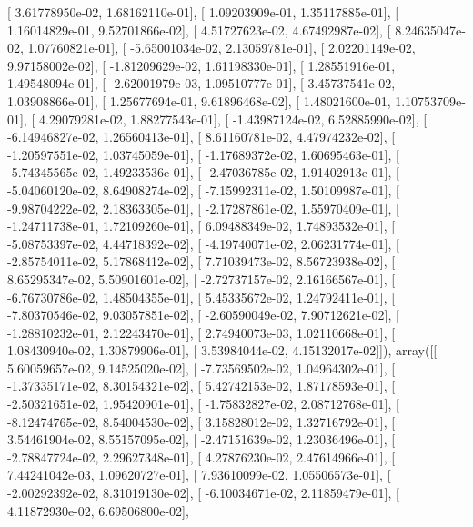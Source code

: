\documentclass{article}
\begin{document}
       [  3.61778950e-02,   1.68162110e-01],
       [  1.09203909e-01,   1.35117885e-01],
       [  1.16014829e-01,   9.52701866e-02],
       [  4.51727623e-02,   4.67492987e-02],
       [  8.24635047e-02,   1.07760821e-01],
       [ -5.65001034e-02,   2.13059781e-01],
       [  2.02201149e-02,   9.97158002e-02],
       [ -1.81209629e-02,   1.61198330e-01],
       [  1.28551916e-01,   1.49548094e-01],
       [ -2.62001979e-03,   1.09510777e-01],
       [  3.45737541e-02,   1.03908866e-01],
       [  1.25677694e-01,   9.61896468e-02],
       [  1.48021600e-01,   1.10753709e-01],
       [  4.29079281e-02,   1.88277543e-01],
       [ -1.43987124e-02,   6.52885990e-02],
       [ -6.14946827e-02,   1.26560413e-01],
       [  8.61160781e-02,   4.47974232e-02],
       [ -1.20597551e-02,   1.03745059e-01],
       [ -1.17689372e-02,   1.60695463e-01],
       [ -5.74345565e-02,   1.49233536e-01],
       [ -2.47036785e-02,   1.91402913e-01],
       [ -5.04060120e-02,   8.64908274e-02],
       [ -7.15992311e-02,   1.50109987e-01],
       [ -9.98704222e-02,   2.18363305e-01],
       [ -2.17287861e-02,   1.55970409e-01],
       [ -1.24711738e-01,   1.72109260e-01],
       [  6.09488349e-02,   1.74893532e-01],
       [ -5.08753397e-02,   4.44718392e-02],
       [ -4.19740071e-02,   2.06231774e-01],
       [ -2.85754011e-02,   5.17868412e-02],
       [  7.71039473e-02,   8.56723938e-02],
       [  8.65295347e-02,   5.50901601e-02],
       [ -2.72737157e-02,   2.16166567e-01],
       [ -6.76730786e-02,   1.48504355e-01],
       [  5.45335672e-02,   1.24792411e-01],
       [ -7.80370546e-02,   9.03057851e-02],
       [ -2.60590049e-02,   7.90712621e-02],
       [ -1.28810232e-01,   2.12243470e-01],
       [  2.74940073e-03,   1.02110668e-01],
       [  1.08430940e-02,   1.30879906e-01],
       [  3.53984044e-02,   4.15132017e-02]]), array([[  5.60059657e-02,   9.14525020e-02],
       [ -7.73569502e-02,   1.04964302e-01],
       [ -1.37335171e-02,   8.30154321e-02],
       [  5.42742153e-02,   1.87178593e-01],
       [ -2.50321651e-02,   1.95420901e-01],
       [ -1.75832827e-02,   2.08712768e-01],
       [ -8.12474765e-02,   8.54004530e-02],
       [  3.15828012e-02,   1.32716792e-01],
       [  3.54461904e-02,   8.55157095e-02],
       [ -2.47151639e-02,   1.23036496e-01],
       [ -2.78847724e-02,   2.29627348e-01],
       [  4.27876230e-02,   2.47614966e-01],
       [  7.44241042e-03,   1.09620727e-01],
       [  7.93610099e-02,   1.05506573e-01],
       [ -2.00292392e-02,   8.31019130e-02],
       [ -6.10034671e-02,   2.11859479e-01],
       [  4.11872930e-02,   6.69506800e-02],
\end{document}
